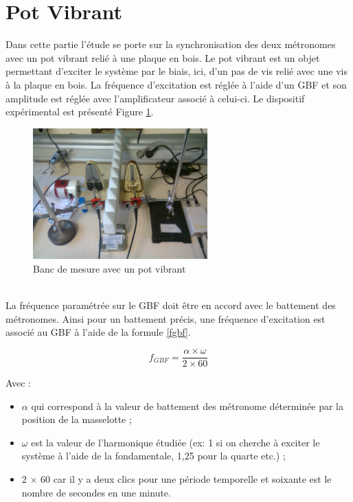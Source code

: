\documentclass[a4paper,11pt]{report}
\begin{document}
\section{Pot Vibrant}
Dans cette partie l'étude se porte sur la synchronisation des deux métronomes avec un pot vibrant relié à une plaque en bois. Le pot vibrant est un objet permettant d'exciter le système par le biais, ici, d'un pas de vis relié avec une vis à la plaque en bois. La fréquence d'excitation est réglée à l'aide d'un GBF et son amplitude est réglée avec l'amplificateur associé à celui-ci. Le dispositif expérimental est présenté Figure \ref{BancPot}.\\
\begin{figure}[h]
\centering
\includegraphics[width=0.6\textwidth]{Bancpotvibrant}
\caption{Banc de mesure avec un pot vibrant}\label{BancPot}
\end{figure}\\
La fréquence paramétrée sur le GBF doit être en accord avec le battement des métronomes. Ainsi pour un battement précis, une fréquence d'excitation est associé au GBF à l'aide de la formule \ref{fgbf}.

\begin{equation}
f_{GBF}=\frac{\alpha \times \omega}{2 \times 60}
\label{fgbf}
\end{equation}

Avec :\\
\begin{itemize}[label=\textbullet, leftmargin=* ,parsep=0cm,itemsep=0cm,topsep=0cm,font=\tiny]
\item $\alpha$ qui correspond à la valeur de battement des métronome déterminée par la position de la masselotte ;
\item $\omega$ est la valeur de l'harmonique étudiée (ex: 1 si on cherche à exciter le système à l'aide de la fondamentale, 1,25 pour la quarte etc.) ;
\item 2 $\times$ 60 car il y a deux clics pour une période temporelle et soixante est le nombre de secondes en une minute.\\
\end{itemize}
\end{document}
